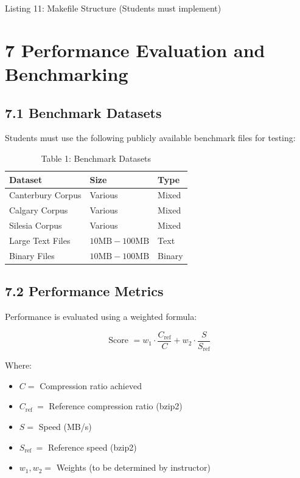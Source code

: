 \documentclass[10pt]{article}
\begin{document}
Listing 11: Makefile Structure (Students must implement)

\section*{7 Performance Evaluation and Benchmarking}
\subsection*{7.1 Benchmark Datasets}
Students must use the following publicly available benchmark files for testing:

\begin{table}[h]
\begin{center}
\captionsetup{labelformat=empty}
\caption{Table 1: Benchmark Datasets}
\begin{tabular}{|l|l|l|}
\hline
Dataset & Size & Type \\
\hline
Canterbury Corpus & Various & Mixed \\
\hline
Calgary Corpus & Various & Mixed \\
\hline
Silesia Corpus & Various & Mixed \\
\hline
Large Text Files & $10 \mathrm{MB}-100 \mathrm{MB}$ & Text \\
\hline
Binary Files & $10 \mathrm{MB}-100 \mathrm{MB}$ & Binary \\
\hline
\end{tabular}
\end{center}
\end{table}

\subsection*{7.2 Performance Metrics}
Performance is evaluated using a weighted formula:

$$
\text { Score }=w_{1} \cdot \frac{C_{\mathrm{ref}}}{C}+w_{2} \cdot \frac{S}{S_{\mathrm{ref}}}
$$

Where:

\begin{itemize}
  \item $C=$ Compression ratio achieved
  \item $C_{\text {ref }}=$ Reference compression ratio (bzip2)
  \item $S=$ Speed (MB/s)
  \item $S_{\text {ref }}=$ Reference speed (bzip2)
  \item $w_{1}, w_{2}=$ Weights (to be determined by instructor)
\end{itemize}
\end{document}

